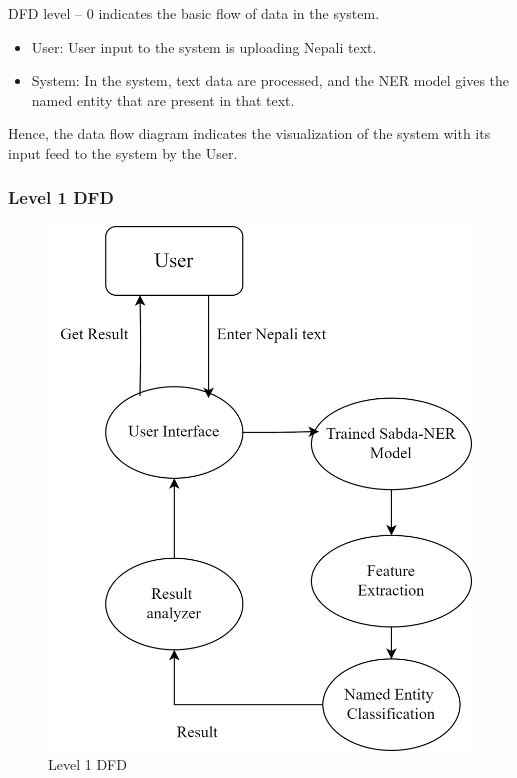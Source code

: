 \vspace{30pt} %
 
DFD level – 0 indicates the basic flow of data in the system.
\begin{itemize}
    \item User: User input to the system is uploading Nepali text.
    \item System: In the system, text data are processed, and the NER model gives the
named entity that are present in that text.
\end{itemize}

Hence, the data flow diagram indicates the visualization of the system with its input
feed to the system by the User.


\subsubsection{Level 1 DFD}

\begin{figure}[H]
\centering
\includegraphics [scale=0.9]{img/systemBlock-etc/_dfd1.png}
\caption[ Level 1 DFD]{ Level 1 DFD}

\end{figure}

